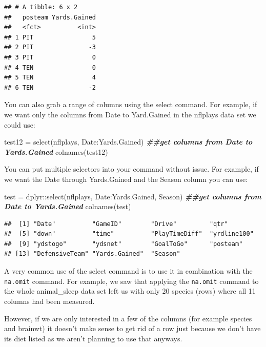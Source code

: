 \documentclass[
]{book}
\newenvironment{Shaded}{\begin{snugshade}}{\end{snugshade}}
\newcommand{\DocumentationTok}[1]{\textcolor[rgb]{0.56,0.35,0.01}{\textbf{\textit{#1}}}}
\newcommand{\FunctionTok}[1]{\textcolor[rgb]{0.00,0.00,0.00}{#1}}
\newcommand{\NormalTok}[1]{#1}
\newcommand{\OtherTok}[1]{\textcolor[rgb]{0.56,0.35,0.01}{#1}}
\newcommand{\SpecialCharTok}[1]{\textcolor[rgb]{0.00,0.00,0.00}{#1}}
\theoremstyle{definition}
\theoremstyle{definition}
\theoremstyle{definition}
\theoremstyle{definition}
\theoremstyle{remark}
\begin{document}
\begin{verbatim}
## # A tibble: 6 x 2
##   posteam Yards.Gained
##   <fct>          <int>
## 1 PIT                5
## 2 PIT               -3
## 3 PIT                0
## 4 TEN                0
## 5 TEN                4
## 6 TEN               -2
\end{verbatim}

You can also grab a range of columns using the select command. For example, if we want only the columns from Date to Yard.Gained in the nflplays data set we could use:

\begin{Shaded}
\begin{Highlighting}[]
\NormalTok{test12 }\OtherTok{=} \FunctionTok{select}\NormalTok{(nflplays, Date}\SpecialCharTok{:}\NormalTok{Yards.Gained)  }\DocumentationTok{\#\#get columns from Date to Yards.Gained}
\FunctionTok{colnames}\NormalTok{(test12)}
\end{Highlighting}
\end{Shaded}

You can put multiple selectors into your command without issue. For example, if we want the Date through Yards.Gained and the Season column you can use:

\begin{Shaded}
\begin{Highlighting}[]
\NormalTok{test }\OtherTok{=}\NormalTok{ dplyr}\SpecialCharTok{::}\FunctionTok{select}\NormalTok{(nflplays, Date}\SpecialCharTok{:}\NormalTok{Yards.Gained, Season)  }\DocumentationTok{\#\#get columns from Date to Yards.Gained}
\FunctionTok{colnames}\NormalTok{(test)}
\end{Highlighting}
\end{Shaded}

\begin{verbatim}
##  [1] "Date"          "GameID"        "Drive"         "qtr"          
##  [5] "down"          "time"          "PlayTimeDiff"  "yrdline100"   
##  [9] "ydstogo"       "ydsnet"        "GoalToGo"      "posteam"      
## [13] "DefensiveTeam" "Yards.Gained"  "Season"
\end{verbatim}

A very common use of the select command is to use it in combination with the \texttt{na.omit} command. For example, we saw that applying the \texttt{na.omit} command to the whole animal\_sleep data set left us with only 20 species (rows) where all 11 columns had been measured.

However, if we are only interested in a few of the columns (for example species and brainwt) it doesn't make sense to get rid of a row just because we don't have its diet listed as we aren't planning to use that anyways.
\end{document}
